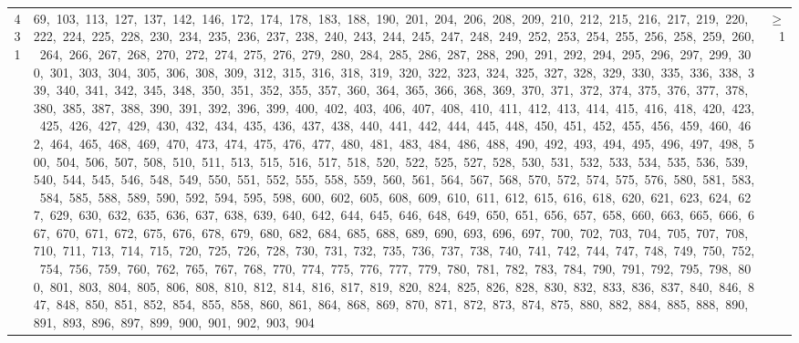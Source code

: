 \begin{longtable}{c|p{}|r}
431 & 69,\ 103,\ 113,\ 127,\ 137,\ 142,\ 146,\ 172,\ 174,\ 178,\ 183,\ 188,\ 190,\ 201,\ 204,\ 206,\ 208,\ 209,\ 210,\ 212,\ 215,\ 216,\ 217,\ 219,\ 220,\ 222,\ 224,\ 225,\ 228,\ 230,\ 234,\ 235,\ 236,\ 237,\ 238,\ 240,\ 243,\ 244,\ 245,\ 247,\ 248,\ 249,\ 252,\ 253,\ 254,\ 255,\ 256,\ 258,\ 259,\ 260,\ 264,\ 266,\ 267,\ 268,\ 270,\ 272,\ 274,\ 275,\ 276,\ 279,\ 280,\ 284,\ 285,\ 286,\ 287,\ 288,\ 290,\ 291,\ 292,\ 294,\ 295,\ 296,\ 297,\ 299,\ 300,\ 301,\ 303,\ 304,\ 305,\ 306,\ 308,\ 309,\ 312,\ 315,\ 316,\ 318,\ 319,\ 320,\ 322,\ 323,\ 324,\ 325,\ 327,\ 328,\ 329,\ 330,\ 335,\ 336,\ 338,\ 339,\ 340,\ 341,\ 342,\ 345,\ 348,\ 350,\ 351,\ 352,\ 355,\ 357,\ 360,\ 364,\ 365,\ 366,\ 368,\ 369,\ 370,\ 371,\ 372,\ 374,\ 375,\ 376,\ 377,\ 378,\ 380,\ 385,\ 387,\ 388,\ 390,\ 391,\ 392,\ 396,\ 399,\ 400,\ 402,\ 403,\ 406,\ 407,\ 408,\ 410,\ 411,\ 412,\ 413,\ 414,\ 415,\ 416,\ 418,\ 420,\ 423,\ 425,\ 426,\ 427,\ 429,\ 430,\ 432,\ 434,\ 435,\ 436,\ 437,\ 438,\ 440,\ 441,\ 442,\ 444,\ 445,\ 448,\ 450,\ 451,\ 452,\ 455,\ 456,\ 459,\ 460,\ 462,\ 464,\ 465,\ 468,\ 469,\ 470,\ 473,\ 474,\ 475,\ 476,\ 477,\ 480,\ 481,\ 483,\ 484,\ 486,\ 488,\ 490,\ 492,\ 493,\ 494,\ 495,\ 496,\ 497,\ 498,\ 500,\ 504,\ 506,\ 507,\ 508,\ 510,\ 511,\ 513,\ 515,\ 516,\ 517,\ 518,\ 520,\ 522,\ 525,\ 527,\ 528,\ 530,\ 531,\ 532,\ 533,\ 534,\ 535,\ 536,\ 539,\ 540,\ 544,\ 545,\ 546,\ 548,\ 549,\ 550,\ 551,\ 552,\ 555,\ 558,\ 559,\ 560,\ 561,\ 564,\ 567,\ 568,\ 570,\ 572,\ 574,\ 575,\ 576,\ 580,\ 581,\ 583,\ 584,\ 585,\ 588,\ 589,\ 590,\ 592,\ 594,\ 595,\ 598,\ 600,\ 602,\ 605,\ 608,\ 609,\ 610,\ 611,\ 612,\ 615,\ 616,\ 618,\ 620,\ 621,\ 623,\ 624,\ 627,\ 629,\ 630,\ 632,\ 635,\ 636,\ 637,\ 638,\ 639,\ 640,\ 642,\ 644,\ 645,\ 646,\ 648,\ 649,\ 650,\ 651,\ 656,\ 657,\ 658,\ 660,\ 663,\ 665,\ 666,\ 667,\ 670,\ 671,\ 672,\ 675,\ 676,\ 678,\ 679,\ 680,\ 682,\ 684,\ 685,\ 688,\ 689,\ 690,\ 693,\ 696,\ 697,\ 700,\ 702,\ 703,\ 704,\ 705,\ 707,\ 708,\ 710,\ 711,\ 713,\ 714,\ 715,\ 720,\ 725,\ 726,\ 728,\ 730,\ 731,\ 732,\ 735,\ 736,\ 737,\ 738,\ 740,\ 741,\ 742,\ 744,\ 747,\ 748,\ 749,\ 750,\ 752,\ 754,\ 756,\ 759,\ 760,\ 762,\ 765,\ 767,\ 768,\ 770,\ 774,\ 775,\ 776,\ 777,\ 779,\ 780,\ 781,\ 782,\ 783,\ 784,\ 790,\ 791,\ 792,\ 795,\ 798,\ 800,\ 801,\ 803,\ 804,\ 805,\ 806,\ 808,\ 810,\ 812,\ 814,\ 816,\ 817,\ 819,\ 820,\ 824,\ 825,\ 826,\ 828,\ 830,\ 832,\ 833,\ 836,\ 837,\ 840,\ 846,\ 847,\ 848,\ 850,\ 851,\ 852,\ 854,\ 855,\ 858,\ 860,\ 861,\ 864,\ 868,\ 869,\ 870,\ 871,\ 872,\ 873,\ 874,\ 875,\ 880,\ 882,\ 884,\ 885,\ 888,\ 890,\ 891,\ 893,\ 896,\ 897,\ 899,\ 900,\ 901,\ 902,\ 903,\ 904 & $\ge$ 1 \\

\end{longtable}
